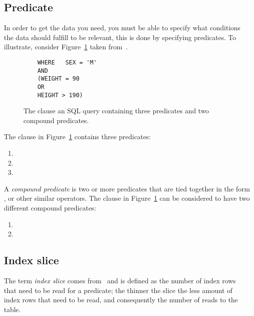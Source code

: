 \subsection*{Predicate}
In order to get the data you need, you must be able to specify what conditions
the data should fulfill to be relevant, this is done by specifying predicates.
To illustrate, consider Figure~\ref{fig:sql:predicate} taken
from~\cite{lahdenmaki_2005_relational_rdidatodossea}.

\begin{figure}[ht]
  \begin{verbatim}
    WHERE   SEX = 'M'
    AND
    (WEIGHT = 90
    OR
    HEIGHT > 190)
  \end{verbatim}
  \caption[The  clause of a query containing three predicates and two
  compound predicates]{The  clause an SQL query containing three
    predicates and two compound predicates.}\label{fig:sql:predicate}
\end{figure}

The  clause in Figure~\ref{fig:sql:predicate} contains three
predicates:
\begin{enumerate}
\item {}
\item {}
\item {}
\end{enumerate}

A \textit{compound predicate} is two or more predicates that are tied together
in the form ,  or other similar operators. The 
clause in Figure~\ref{fig:sql:predicate} can be considered to have two different
compound predicates:
\begin{enumerate}
\item {}
\item {}
\end{enumerate}

\subsection*{Index slice}
The term \textit{index slice} comes
from~\cite{lahdenmaki_2005_relational_rdidatodossea} and is defined as the
number of index rows that need to be read for a predicate; the thinner the slice
the less amount of index rows that need to be read, and consequently the number
of reads to the table.


